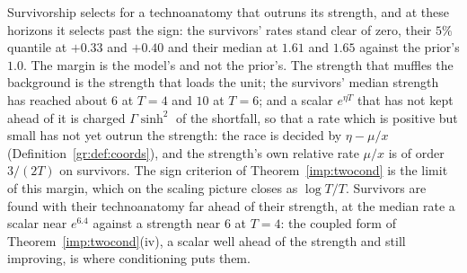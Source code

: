 \noindent Survivorship selects for a technoanatomy that outruns its
strength, and at these horizons it selects past the sign: the survivors'
rates stand clear of zero, their $5\%$ quantile at $+0.33$ and $+0.40$ and
their median at $1.61$ and $1.65$ against the prior's $1.0$. The margin is
the model's and not the prior's. The strength that muffles the background
is the strength that loads the unit; the survivors' median strength has
reached about $6$ at $T=4$ and $10$ at $T=6$; and a scalar $e^{\eta T}$
that has not kept ahead of it is charged $\Gamma\sinh^2$ of the shortfall,
so that a rate which is positive but small has not yet outrun the
strength: the race is decided by $\eta-\mu/x$
(Definition~\ref{gr:def:coords}), and the strength's own relative rate
$\mu/x$ is of order $3/(2T)$ on survivors. The sign criterion of
Theorem~\ref{imp:twocond} is the limit of this margin, which on the
scaling picture closes as $\log T/T$. Survivors
are found with their technoanatomy far ahead of their strength, at the
median rate a scalar near $e^{6.4}$ against a strength near $6$ at $T=4$:
the coupled form of Theorem~\ref{imp:twocond}(iv), a scalar well ahead of
the strength and still improving, is where conditioning puts them.

